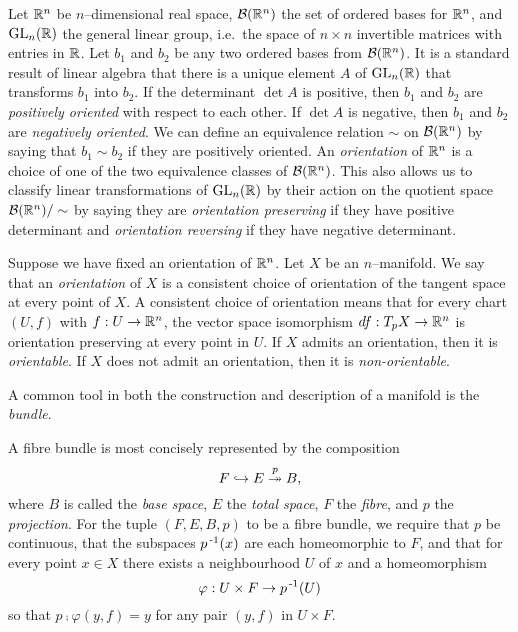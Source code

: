 \begin{defn}[Orientation]
	\label{def:orientation}
	Let $\mathbb{R}^n$ be $n$--dimensional real space, $\mathcal{B}(\mathbb{R}^n)$ the set of ordered bases for $\mathbb{R}^n$, and $\textrm{GL}_{n}(\mathbb{R})$ the general linear group, i.e.\ the space of $n\times n$ invertible matrices with entries in $\mathbb{R}$.
	Let $b_1$ and $b_2$ be any two ordered bases from $\mathcal{B}(\mathbb{R}^n)$.
	It is a standard result of linear algebra that there is a unique element $A$ of $\textrm{GL}_{n}(\mathbb{R})$ that transforms $b_1$ into $b_2$.
	If the determinant $\det A$ is positive, then $b_1$ and $b_2$ are \emph{positively oriented} with respect to each other.
	If $\det A$ is negative, then $b_1$ and $b_2$ are \emph{negatively oriented}.
	We can define an equivalence relation $\sim$ on $\mathcal{B}(\mathbb{R}^n)$ by saying that $b_1\sim b_2$ if they are positively oriented.
	An \emph{orientation} of $\mathbb{R}^n$ is a choice of one of the two equivalence classes of $\mathcal{B}(\mathbb{R}^n)$.
	This also allows us to classify linear transformations of $\textrm{GL}_{n}(\mathbb{R})$ by their action on the quotient space $\mathcal{B}(\mathbb{R}^n)/\sim$ by saying they are \emph{orientation preserving} if they have positive determinant and \emph{orientation reversing} if they have negative determinant.
	
	Suppose we have fixed an orientation of $\mathbb{R}^n$.
	Let $X$ be an $n$--manifold.
	We say that an \emph{orientation} of $X$ is a consistent choice of orientation of the tangent space at every point of $X$.
	A consistent choice of orientation means that for every chart $(U,f)$ with $f:U\to\mathbb{R}^n$, the vector space isomorphism $df:T_p X\to \mathbb{R}^n$ is orientation preserving at every point in $U$. 
	If $X$ admits an orientation, then it is \emph{orientable}.
	If $X$ does not admit an orientation, then it is \emph{non-orientable}.
\end{defn}

A common tool in both the construction and description of a manifold is the \emph{bundle}.

\begin{defn}
	A fibre bundle is most concisely represented by the composition
	\[
		F\hookrightarrow E\overset{p}{\twoheadrightarrow} B,
	\]
	where $B$ is called the \emph{base space}, $E$ the \emph{total space}, $F$ the \emph{fibre}, and $p$ the \emph{projection}.
	For the tuple $(F,E,B,p)$ to be a fibre bundle, we require that $p$ be continuous, that the subspaces $p^{\,\text{-}1}(x)$ are each homeomorphic to $F$, and that for every point $x\in X$ there exists a neighbourhood $U$ of $x$ and a homeomorphism
	\[
		\varphi: U\times F\to p^{\,\text{-}1}(U)
	\]
	so that $p\comp\varphi(y,f)=y$ for any pair $(y,f)$ in $U\times F$.
	
\end{defn}